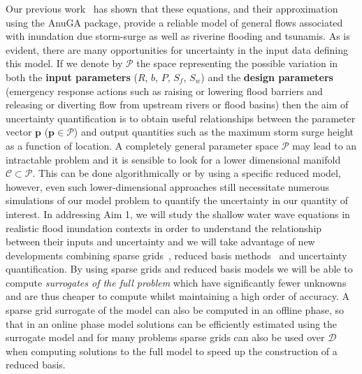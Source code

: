 Our previous work~\parencite{anugamanual,nielsen2005hydrodynamic} has shown that these
equations, and their approximation using the  AnuGA package, provide a reliable
model of general flows associated with inundation due storm-surge as well as riverine flooding and tsunamis.
As is evident, there are many opportunities for uncertainty in the input data defining this model. 
If we denote by $\mathcal{P}$ the space representing the possible variation in both the {\bf input parameters} ($R$, $b$, $P$, $S_f$, $S_w$) and the {\bf design parameters} (emergency response actions such as raising or lowering flood barriers and releasing or diverting flow from upstream rivers or flood basins) then the aim of uncertainty quantification is to obtain useful relationships between the parameter vector $\mathbf{p}$
($\mathbf{p} \in \mathcal{P}$) and output quantities such as the maximum storm surge height as a function of location. 
A completely general parameter space $\mathcal{P}$ may lead to an intractable problem and it is sensible to look for a lower dimensional manifold $\mathcal{C} \subset \mathcal{P}$.
This can be done algorithmically or by using a specific reduced model, however, even such lower-dimensional approaches still necessitate numerous simulations of our model problem to quantify the uncertainty in our quantity of interest. {In addressing Aim 1}, we will study the shallow water wave equations in realistic flood inundation contexts in order to understand the relationship between their inputs and uncertainty and we will take advantage of new
developments combining sparse
grids~\parencite{BungartzGriebel2004}, reduced basis
methods~\parencite{LiebermanEtal2010,Peherstorfer2013,ChenSchwab2015,PeherstorferWillcox2015}
and uncertainty quantification.
 By using sparse
grids and reduced basis models we will be able to compute
\emph{surrogates of the full problem} which have significantly fewer
unknowns and are thus cheaper to compute whilst maintaining a high
order of accuracy. 
A sparse grid surrogate of
the model  can also be computed in an offline phase,
so that in an online phase model solutions can be efficiently
estimated using the surrogate model and for many problems sparse grids
can also be used over $\mathcal{D}$ when computing solutions to the full
model to speed up the construction of a reduced basis.\\


 \iffalse
 
